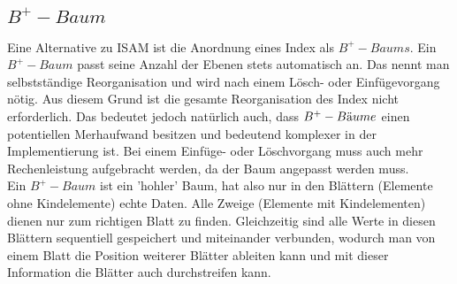 \documentclass{article}
\begin{document}
	\subsection{\texorpdfstring{$B^+-Baum$}{B+ Baum}}
	Eine Alternative zu ISAM ist die Anordnung eines Index als $B^+-Baums$. Ein $B^+-Baum$ passt seine Anzahl der Ebenen stets automatisch an. Das nennt man selbstständige Reorganisation und wird nach einem Lösch- oder Einfügevorgang nötig. Aus diesem Grund ist die gesamte Reorganisation des Index nicht erforderlich. Das bedeutet jedoch natürlich auch, dass $B^+-B\textnormal{ä}ume$ einen potentiellen Merhaufwand besitzen und bedeutend komplexer in der Implementierung ist. Bei einem Einfüge- oder Löschvorgang muss auch mehr Rechenleistung aufgebracht werden, da der Baum angepasst werden muss. \\
	Ein $B^+-Baum$ ist ein 'hohler' Baum, hat also nur in den Blättern (Elemente ohne Kindelemente) echte Daten. Alle Zweige (Elemente mit Kindelementen) dienen nur zum richtigen Blatt zu finden. Gleichzeitig sind alle Werte in diesen Blättern sequentiell gespeichert und miteinander verbunden, wodurch man von einem Blatt die Position weiterer Blätter ableiten kann und mit dieser Information die Blätter auch durchstreifen kann. \\
\end{document}
